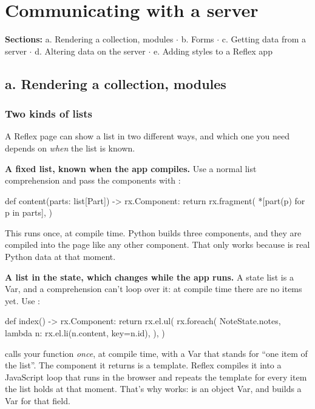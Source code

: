\chapter{Communicating with a server}

\textbf{Sections:} a. Rendering a collection, modules $\cdot$ b. Forms $\cdot$ c. Getting data from a server $\cdot$ d. Altering data on the server $\cdot$ e. Adding styles to a Reflex app

\section{a. Rendering a collection, modules}

\subsection{Two kinds of lists}

A Reflex page can show a list in two different ways, and which one you need depends on \emph{when} the list is known.

\textbf{A fixed list, known when the app compiles.} Use a normal list comprehension and pass the components with \cd{*}:

\begin{py}
def content(parts: list[Part]) -> rx.Component:
	return rx.fragment(
		*[part(p) for p in parts],
	)
\end{py}

This runs once, at compile time. Python builds three  components, and they are compiled into the page like any other component. That only works because  is real Python data at that moment.

\textbf{A list in the state, which changes while the app runs.} A state list is a Var, and a comprehension can't loop over it: at compile time there are no items yet. Use :

\begin{py}
def index() -> rx.Component:
	return rx.el.ul(
		rx.foreach(
			NoteState.notes,
			lambda n: rx.el.li(n.content, key=n.id),
		),
	)
\end{py}

 calls your function \emph{once}, at compile time, with a Var that stands for ``one item of the list''. The component it returns is a template. Reflex compiles it into a JavaScript loop that runs in the browser and repeats the template for every item the list holds at that moment. That's why  works:  is an object Var, and  builds a Var for that field.

